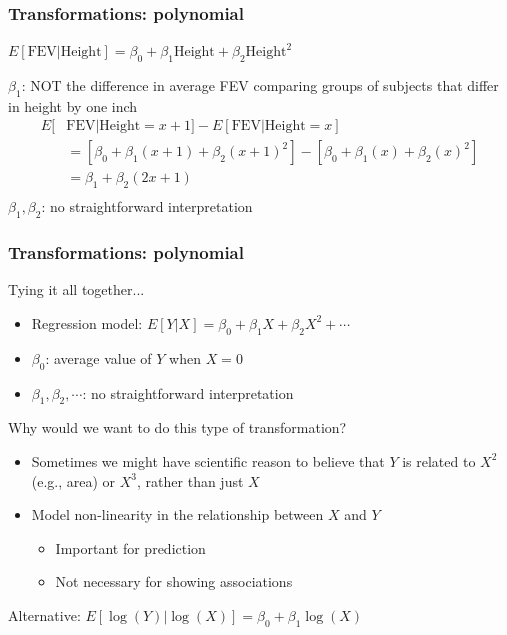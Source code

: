 \documentclass[12pt, 
hyperref={colorlinks=true, linkcolor=blue, urlcolor=cyan}]{beamer}
\begin{document}
\begin{frame}
\frametitle{Transformations: polynomial}
\begin{center} $E[\text{FEV}| \text{Height}] = \beta_0 + \beta_1 \text{Height} + \beta_2 \text{Height}^2$ \end{center}

$\beta_1$: \color{red} NOT \color{black} the difference in average FEV comparing groups of subjects that differ in height by one inch\pause
\begin{align*}
E[&\text{FEV}|\text{Height} = x+1] -E[\text{FEV}|\text{Height} = x]\\
& = \left[\beta_0 + \beta_1 (x+1) + \beta_2(x+1)^2\right] -\left[\beta_0 + \beta_1 (x) + \beta_2(x)^2\right]\\
& = \beta_1 + \beta_2(2x+1) \\
\end{align*}\pause
\color{blue} $\beta_1,\beta_2$: no straightforward interpretation \color{black}
\end{frame}

\begin{frame}
\frametitle{Transformations: polynomial}
Tying it all together...
\begin{itemize}
\item \color{blue} Regression model: \color{black} $E[Y|X] = \beta_0 + \beta_1X + \beta_2 X^2 + \cdots$
\item \color{blue} $\beta_0$: \color{black} average value of $Y$ when $X = 0$
\item \color{blue} $\beta_1, \beta_2, \cdots$: \color{black} no straightforward interpretation
\end{itemize}\pause

Why would we want to do this type of transformation?
\begin{itemize}
\item Sometimes we might have scientific reason to believe that $Y$ is related to $X^2$ (e.g., area) or $X^3$, rather than just $X$
\item Model non-linearity in the relationship between $X$ and $Y$
	\begin{itemize}
	\item Important for prediction
	\item Not necessary for showing associations 
	\end{itemize}
\end{itemize}\pause

Alternative: $E[\log(Y)|\log(X)] = \beta_0 + \beta_1 \log(X)$

\end{frame}
\end{document}
